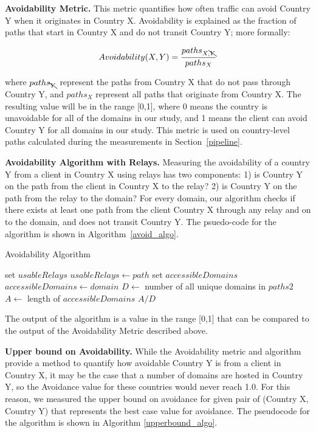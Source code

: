 {\bf Avoidability Metric.}  This metric quantifies how often traffic can avoid Country Y when it originates in Country X.  Avoidability is explained as the fraction of paths that start in Country X and do not transit Country Y; more formally:

\[Avoidability(X,Y) = \frac{paths_{X,\bcancel{Y}}}{paths_{X}}\]

\noindent where $paths_{\bcancel{Y}}$ represent the paths from Country X that do not pass through Country Y, and $paths_{X}$ represent all paths that originate from Country X. The resulting value will be in the range [0,1], where 0 means the country is unavoidable for all of the domains in our study, and 1 means the client can avoid Country Y for all domains in our study.  This metric is used on country-level paths calculated during the measurements in Section~\ref{pipeline}.

{\bf Avoidability Algorithm with Relays.}  Measuring the avoidability of a country Y from a client in Country X using relays has two components: 1) is Country Y on the path from the client in Country X to the relay?  2) is Country Y on the path from the relay to the domain?  For every domain, our algorithm checks if there exists at least one path from the client Country X through any relay and on to the domain, and does not transit Country Y.  The psuedo-code for the algorithm is shown in Algorithm~\ref{avoid_algo}.

\begin{algorithm}[t]
\caption{Avoidability Algorithm}
\label{avoid_algo}
\begin{algorithmic}[1]
    \State set $usableRelays$
		\State $usableRelays \gets path$
	\EndIf
    \EndFor
    \State set $accessibleDomains$
        \State $accessibleDomains \gets domain$
        \EndIf
    \EndIf
    \EndFor
    \State $D \gets$ number of all unique domains in $paths2$
    \State $A \gets$ length of $accessibleDomains$
    \State \Return $A / D$
\EndFunction
\end{algorithmic}
\end{algorithm}

The output of the algorithm is a value in the range [0,1] that can be compared to the output of the Avoidability Metric described above.  

{\bf Upper bound on Avoidability.}  While the Avoidability metric and algorithm provide a method to quantify how avoidable Country Y is from a client in Country X, it may be the case that a number of domains are hosted in Country Y, so the Avoidance value for these countries would never reach 1.0.  For this reason, we measured the upper bound on avoidance for given pair of (Country X, Country Y) that represents the best case value for avoidance.  The pseudocode for the algorithm is shown in Algorithm \ref{upperbound_algo}.

